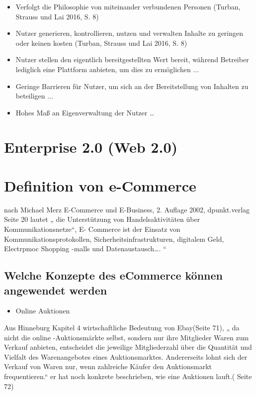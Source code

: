 \begin{itemize}
\item Verfolgt die Philosophie von miteinander verbundenen Personen (Turban, Strauss und Lai 2016, S. 8)
\item Nutzer generieren, kontrollieren, nutzen und verwalten Inhalte zu geringen
oder keinen kosten (Turban, Strauss und Lai 2016, S. 8)
\item Nutzer stellen den eigentlich bereitgestellten Wert bereit, während Betreiber lediglich eine Plattform anbieten, um dies zu ermöglichen ...
\item Geringe Barrieren für Nutzer, um sich an der Bereitstellung von Inhalten zu
beteiligen ...
\item Hohes Maß an Eigenverwaltung der Nutzer …
\end{itemize}


\section{Enterprise 2.0 (Web 2.0)}


\section{Definition von  e-Commerce}

nach Michael Merz E-Commerce und E-Business, 2. Auflage 2002, dpunkt.verlag Seite 20 lautet  „ die Unterstützung von Handelsaktivitäten über Kommunikationsnetze“, E- Commerce ist der Einsatz von Kommunikationsprotokollen, Sicherheitsinfrastrukturen, digitalem Geld, Electrpmoc Shopping -malls und Datenaustausch…. “


\subsection{Welche Konzepte des eCommerce können angewendet werden}

\begin{itemize}
\item Online Auktionen
\end{itemize}

Aus Hinneburg Kapitel 4 wirtschaftliche Bedeutung von Ebay(Seite 71), „ da nicht die online -Auktionsmärkte selbst, sondern nur ihre Mitglieder Waren zum Verkauf anbieten, entscheidet die jeweilige Mitgliederzahl über die Quantität und Vielfalt des Warenangebotes eines Auktionsmarktes. Andererseits lohnt sich der Verkauf von Waren nur, wenn zahlreiche Käufer den Auktionsmarkt frequentieren.“ er hat noch konkrete beschrieben, wie eine Auktionen lauft.( Seite 72)

